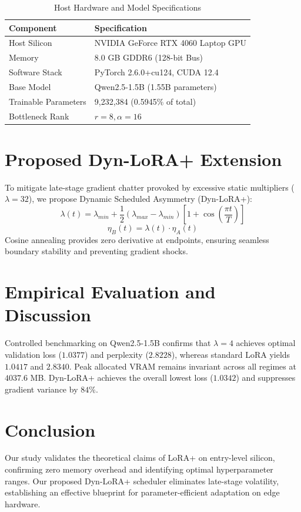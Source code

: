 \documentclass[conference]{IEEEtran}
\begin{document}
\begin{table}[htbp]
\caption{Host Hardware and Model Specifications}
\begin{center}
\begin{tabular}{ll}
\toprule
\textbf{Component} & \textbf{Specification} \\
\midrule
Host Silicon & NVIDIA GeForce RTX 4060 Laptop GPU \\
Memory & 8.0 GB GDDR6 (128-bit Bus) \\
Software Stack & PyTorch 2.6.0+cu124, CUDA 12.4 \\
Base Model & Qwen2.5-1.5B (1.55B parameters) \\
Trainable Parameters & 9,232,384 (0.5945\% of total) \\
Bottleneck Rank & $r=8, \alpha=16$ \\
\bottomrule
\end{tabular}
\label{tab:system_specs}
\end{center}
\end{table}

\section{Proposed Dyn-LoRA+ Extension}
To mitigate late-stage gradient chatter provoked by excessive static multipliers ($\lambda=32$), we propose Dynamic Scheduled Asymmetry (Dyn-LoRA+):
\begin{equation}
\lambda(t) = \lambda_{min} + \frac{1}{2} (\lambda_{max} - \lambda_{min}) \left[1 + \cos\left(\frac{\pi t}{T}\right)\right]
\end{equation}
\begin{equation}
\eta_B(t) = \lambda(t) \cdot \eta_A(t)
\end{equation}
Cosine annealing provides zero derivative at endpoints, ensuring seamless boundary stability and preventing gradient shocks.

\section{Empirical Evaluation and Discussion}
Controlled benchmarking on Qwen2.5-1.5B confirms that $\lambda=4$ achieves optimal validation loss ($1.0377$) and perplexity ($2.8228$), whereas standard LoRA yields $1.0417$ and $2.8340$. Peak allocated VRAM remains invariant across all regimes at $4037.6$ MB. Dyn-LoRA+ achieves the overall lowest loss ($1.0342$) and suppresses gradient variance by $84\%$.

\section{Conclusion}
Our study validates the theoretical claims of LoRA+ on entry-level silicon, confirming zero memory overhead and identifying optimal hyperparameter ranges. Our proposed Dyn-LoRA+ scheduler eliminates late-stage volatility, establishing an effective blueprint for parameter-efficient adaptation on edge hardware.
\end{document}
